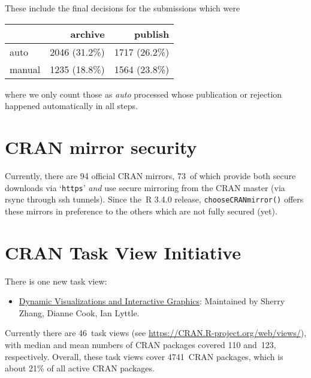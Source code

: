 These include the final decisions for the submissions which were
\begin{longtable}[]{@{}lrr@{}}
\toprule\noalign{}
& archive & publish \\
\midrule\noalign{}
\endhead
\bottomrule\noalign{}
\endlastfoot
auto & 2046 (31.2\%) & 1717 (26.2\%) \\
manual & 1235 (18.8\%) & 1564 (23.8\%) \\
\end{longtable}
\noindent where we only count those as \emph{auto} processed whose publication or
rejection happened automatically in all steps.
\section{CRAN mirror security}\label{cran-mirror-security}
Currently, there are 94 official CRAN mirrors,
73~of which provide both
secure downloads via `\texttt{https}' \emph{and} use secure mirroring from the CRAN master
(via rsync through ssh tunnels). Since the~R 3.4.0 release, \texttt{chooseCRANmirror()}
offers these mirrors in preference to the others which are not fully secured (yet).
\section{CRAN Task View Initiative}\label{cran-task-view-initiative}
There is one new task view:
\begin{itemize}
\tightlist
\item
  \href{https://CRAN.R-project.org/view=DynamicVisualizations}{Dynamic Visualizations and Interactive Graphics}: Maintained by Sherry Zhang, Dianne Cook, Ian Lyttle.
\end{itemize}
Currently there are 46~task views (see \url{https://CRAN.R-project.org/web/views/}),
with median and mean numbers of CRAN packages covered
110 and~123, respectively.
Overall, these task views cover 4741~CRAN packages,
which is about 21\% of all active CRAN packages.
\address{%
Kurt Hornik\\
WU Wirtschaftsuniversität Wien\\%
Austria\\
%
%
\textit{ORCiD: \href{https://orcid.org/0000-0003-4198-9911}{0000-0003-4198-9911}}\\%
\href{mailto:Kurt.Hornik@R-project.org}{\nolinkurl{Kurt.Hornik@R-project.org}}%
}
\address{%
Uwe Ligges\\
TU Dortmund\\%
Germany\\
%
%
\textit{ORCiD: \href{https://orcid.org/0000-0001-5875-6167}{0000-0001-5875-6167}}\\%
\href{mailto:Uwe.Ligges@R-project.org}{\nolinkurl{Uwe.Ligges@R-project.org}}%
}
\address{%
Achim Zeileis\\
Universität Innsbruck\\%
Austria\\
%
%
\textit{ORCiD: \href{https://orcid.org/0000-0003-0918-3766}{0000-0003-0918-3766}}\\%
\href{mailto:Achim.Zeileis@R-project.org}{\nolinkurl{Achim.Zeileis@R-project.org}}%
}
